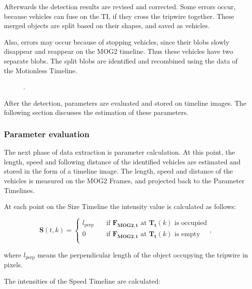 Afterwards the detection results are revised and corrected.
Some errors occur, because vehicles can fuse on the TI, if they cross the tripwire together. These merged objects are split based on their shapes, and saved as vehicles.

Also, errors may occur because of stopping vehicles, since their blobs slowly disappear and reappear on the MOG2 timeline.
Thus these vehicles have two separate blobs.
The split blobs are identified and recombined using the data of the Motionless Timeline. 

\begin{figure}[!h]
	\centering
	
	\caption{.\label{fig:size_speed_following_distance}}
\end{figure}

After the detection, parameters are evaluated and stored on timeline images.
The following section discusses the estimation of these parameters.

\subsubsection{Parameter evaluation}\label{chap:parameter_evaluation}
The next phase of data extraction is parameter calculation.
At this point, the length, speed and following distance of the identified vehicles are estimated and stored in the form of a timeline image.
The length, speed and distance of the vehicles is measured on the MOG2 Frames, and projected back to the Parameter Timelines.

At each point on the Size Timeline the intensity value is calculated as follows:

\begin{displaymath}
 	\boldsymbol{S}(t,k) = 
	\begin{cases}
	l_{\text{perp}}        & \quad \text{if } \boldsymbol{F_{\text{MOG2},t}} \text{ at } \boldsymbol{T_t}(k) \text{ is occupied}\\
  	0		& \quad \text{if } \boldsymbol{F_{\text{MOG2},t}} \text{ at } \boldsymbol{T_t}(k)  \text{ is empty}\\
	\end{cases},
\end{displaymath}

where $l_{\text{perp}}$ means the perpendicular length of the object occupying the tripwire in pixels.

The intensities of the Speed Timeline are calculated:

